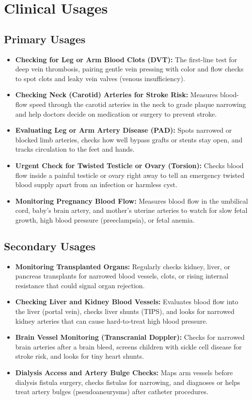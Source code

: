 \section{Clinical Usages}

\subsection{Primary Usages}
\begin{itemize}
\item \textbf{Checking for Leg or Arm Blood Clots (DVT):} The first-line test for deep vein thrombosis, pairing gentle vein pressing with color and flow checks to spot clots and leaky vein valves (venous insufficiency).
\item \textbf{Checking Neck (Carotid) Arteries for Stroke Risk:} Measures blood-flow speed through the carotid arteries in the neck to grade plaque narrowing and help doctors decide on medication or surgery to prevent stroke.
\item \textbf{Evaluating Leg or Arm Artery Disease (PAD):} Spots narrowed or blocked limb arteries, checks how well bypass grafts or stents stay open, and tracks circulation to the feet and hands.
\item \textbf{Urgent Check for Twisted Testicle or Ovary (Torsion):} Checks blood flow inside a painful testicle or ovary right away to tell an emergency twisted blood supply apart from an infection or harmless cyst.
\item \textbf{Monitoring Pregnancy Blood Flow:} Measures blood flow in the umbilical cord, baby's brain artery, and mother's uterine arteries to watch for slow fetal growth, high blood pressure (preeclampsia), or fetal anemia.
\end{itemize}

\subsection{Secondary Usages}
\begin{itemize}
\item \textbf{Monitoring Transplanted Organs:} Regularly checks kidney, liver, or pancreas transplants for narrowed blood vessels, clots, or rising internal resistance that could signal organ rejection.
\item \textbf{Checking Liver and Kidney Blood Vessels:} Evaluates blood flow into the liver (portal vein), checks liver shunts (TIPS), and looks for narrowed kidney arteries that can cause hard-to-treat high blood pressure.
\item \textbf{Brain Vessel Monitoring (Transcranial Doppler):} Checks for narrowed brain arteries after a brain bleed, screens children with sickle cell disease for stroke risk, and looks for tiny heart shunts.
\item \textbf{Dialysis Access and Artery Bulge Checks:} Maps arm vessels before dialysis fistula surgery, checks fistulas for narrowing, and diagnoses or helps treat artery bulges (pseudoaneurysms) after catheter procedures.
\end{itemize}


